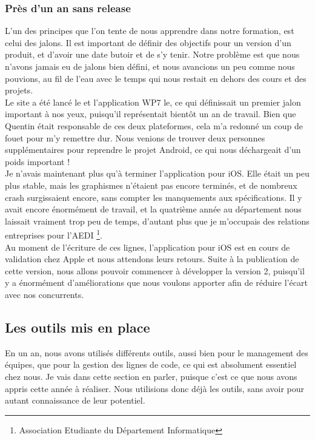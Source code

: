 \documentclass{article}
\begin{document}
\subsubsection{Près d'un an sans release}
		L'un des principes que l'on tente de nous apprendre dans notre formation, est celui des jalons. Il est important de définir des objectifs pour un version d'un produit, et d'avoir une date butoir et de s'y tenir. Notre problème est que nous n'avons jamais eu de jalons bien défini, et nous avancions un peu comme nous pouvions, au fil de l'eau avec le temps qui nous restait en dehors des cours et des projets.  \\
		
		Le site a été lancé le et l'application WP7 le, ce qui définissait un premier jalon important à nos yeux, puisqu'il représentait bientôt un an de travail. Bien que Quentin était responsable de ces deux plateformes, cela m'a redonné un coup de fouet pour m'y remettre dur. Nous venions de trouver deux personnes supplémentaires pour reprendre le projet Android, ce qui nous déchargeait d'un poids important !\\
		
		Je n'avais maintenant plus qu'à terminer l'application pour iOS. Elle était un peu plus stable, mais les graphismes n'étaient pas encore terminés, et de nombreux crash surgissaient encore, sans compter les manquements aux spécifications. Il y avait encore énormément de travail, et la quatrième année au département nous laissait vraiment trop peu de temps, d'autant plus que je m'occupais des relations entreprises pour l'AEDI \footnote{Association Etudiante du Département Informatique}. \\
		
		Au moment de l'écriture de ces lignes, l'application pour iOS est en cours de validation chez Apple et nous attendons leurs retours. Suite à la publication de cette version, nous allons pouvoir commencer à développer la version 2, puisqu'il y a énormément d'améliorations que nous voulons apporter afin de réduire l'écart avec nos concurrents. 
		
\subsection{Les outils mis en place}
		En un an, nous avons utilisés différents outils, aussi bien pour le management des équipes, que pour la gestion des lignes de code, ce qui est absolument essentiel chez nous. Je vais dans cette section en parler, puisque c'est ce que nous avons appris cette année à réaliser. Nous utilisions donc déjà les outils, sans avoir pour autant connaissance de leur potentiel.
\end{document}
